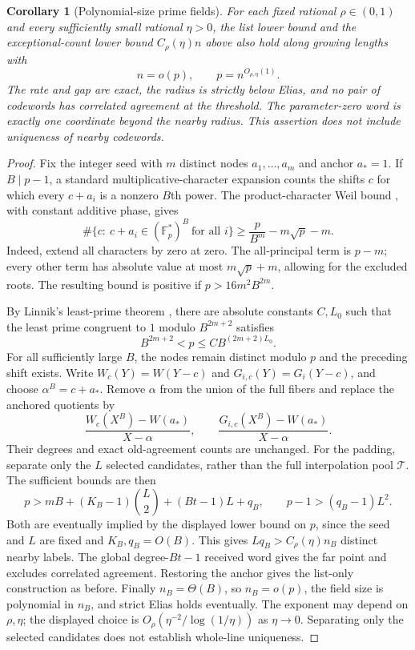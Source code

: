 \documentclass[11pt,letterpaper]{article}
\newtheorem{corollary}[theorem]{Corollary}
\theoremstyle{definition}
\theoremstyle{remark}
\newcommand{\F}{\mathbb F}
\begin{document}
\begin{corollary}[Polynomial-size prime fields]\label{fg:polynomial-fields}
For each fixed rational $\rho\in(0,1)$ and every sufficiently small
rational $\eta>0$, the list lower bound and the exceptional-count lower
bound $C_\rho(\eta)n$ above also hold along growing lengths with
\[
 n=o(p),\qquad p=n^{O_{\rho,\eta}(1)}.
\]
The rate and gap are exact, the radius is strictly below Elias, and
no pair of codewords has correlated agreement at the threshold.
The parameter-zero word is exactly one coordinate beyond the nearby
radius. This assertion does not include uniqueness of nearby codewords.
\end{corollary}
\begin{proof}
Fix the integer seed with $m$ distinct nodes $a_1,\ldots,a_m$ and
anchor $a_*=1$. If $B\mid p-1$, a standard multiplicative-character
expansion counts the shifts $c$ for which every $c+a_i$ is a nonzero
$B$th power. The product-character Weil bound
\cite[Lemma 17]{bgks-shifted}, with constant additive phase, gives
\[
 \#\{c:\ c+a_i\in(\F_p^*)^B\ \text{for all }i\}
 \ge \frac{p}{B^m}-m\sqrt p-m.
\]
Indeed, extend all characters by zero at zero. The all-principal
term is $p-m$; every other term has absolute value at most
$m\sqrt p+m$, allowing for the excluded roots. The resulting bound
is positive if $p>16m^2B^{2m}$.

By Linnik's least-prime theorem \cite{xylouris-linnik}, there are
absolute constants $C,L_0$ such that the least prime congruent to $1$
modulo $B^{2m+2}$ satisfies
\[
 B^{2m+2}<p\le C B^{(2m+2)L_0}.
\]
For all sufficiently large $B$, the nodes remain distinct modulo $p$
and the preceding shift exists. Write $W_c(Y)=W(Y-c)$ and
$G_{i,c}(Y)=G_i(Y-c)$, and choose $\alpha^B=c+a_*$. Remove $\alpha$
from the union of the full fibers and replace the anchored quotients by
\[
 \frac{W_c(X^B)-W(a_*)}{X-\alpha},\qquad
 \frac{G_{i,c}(X^B)-W(a_*)}{X-\alpha}.
\]
Their degrees and exact old-agreement counts are unchanged.
For the padding, separate only the $L$ selected candidates, rather
than the full interpolation pool $\mathcal T$. The sufficient bounds
are then
\[
 p>mB+(K_B-1)\binom L2+(Bt-1)L+q_B,\qquad p-1>(q_B-1)L^2.
\]
Both are eventually implied by the displayed lower bound on $p$,
since the seed and $L$ are fixed and $K_B,q_B=O(B)$. This gives
$Lq_B>C_\rho(\eta)n_B$ distinct nearby labels. The global degree-$Bt-1$
received word gives the far point and excludes correlated agreement. Restoring the anchor
gives the list-only construction as before. Finally $n_B=\Theta(B)$,
so $n_B=o(p)$, the field size is polynomial in $n_B$, and strict
Elias holds eventually. The exponent may depend on $\rho,\eta$;
the displayed choice is $O_\rho(\eta^{-2}/\log(1/\eta))$ as
$\eta\to0$. Separating only the selected candidates does not
establish whole-line uniqueness.
\end{proof}
\end{document}
